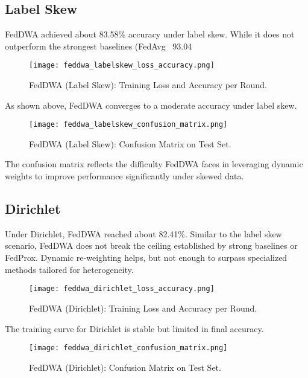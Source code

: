 \documentclass[12pt,a4paper]{report}
\begin{document}
\subsection{Label Skew}
FedDWA achieved about 83.58\% accuracy under label skew. While it does not outperform the strongest baselines (FedAvg ~93.04%

\begin{figure}[H]
	\centering
	\texttt{[image: feddwa\_labelskew\_loss\_accuracy.png]}
	\caption{FedDWA (Label Skew): Training Loss and Accuracy per Round.}
\end{figure}

As shown above, FedDWA converges to a moderate accuracy under label skew.

\begin{figure}[H]
	\centering
	\texttt{[image: feddwa\_labelskew\_confusion\_matrix.png]}
	\caption{FedDWA (Label Skew): Confusion Matrix on Test Set.}
\end{figure}

The confusion matrix reflects the difficulty FedDWA faces in leveraging dynamic weights to improve performance significantly under skewed data.

\subsection{Dirichlet}
Under Dirichlet, FedDWA reached about 82.41\%. Similar to the label skew scenario, FedDWA does not break the ceiling established by strong baselines or FedProx. Dynamic re-weighting helps, but not enough to surpass specialized methods tailored for heterogeneity.

\begin{figure}[H]
	\centering
	\texttt{[image: feddwa\_dirichlet\_loss\_accuracy.png]}
	\caption{FedDWA (Dirichlet): Training Loss and Accuracy per Round.}
\end{figure}

The training curve for Dirichlet is stable but limited in final accuracy.

\begin{figure}[H]
	\centering
	\texttt{[image: feddwa\_dirichlet\_confusion\_matrix.png]}
	\caption{FedDWA (Dirichlet): Confusion Matrix on Test Set.}
\end{figure}
\end{document}
